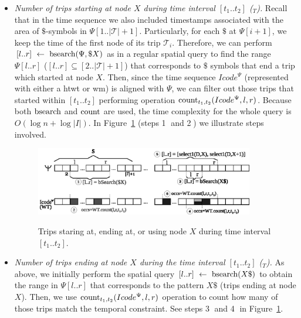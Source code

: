 	\begin{itemize}
	
		\item {\em Number of trips starting at node $X$ during time interval $[t_1..t_2]$ (\startX$_T$).}
		Recall that in the time sequence we also included timestamps associated with the area of $\$$-symbols in $\Psi[1..|\mathcal{T}|+1]$.
		Particularly, for each $\$$ at $\Psi[i+1]$, we keep the time of the first node of its trip $\mathcal{T}_i$. Therefore, 
		we can perform $[l..r]~\leftarrow~\operatorname{bsearch}(\Psi,\$X)$ as in a regular spatial query to find the
		range $\Psi[l..r]$ ($[l..r]\subseteq [2..|\mathcal{T}|+1]$) that corresponds to $\$$ symbols that end a trip which started at node $X$. Then, since the time sequence $Icode^{\Psi}$ 
		(represented with either a \gls{htwt} or \gls{wm}) is
		 aligned with $\Psi$, we can filter out those trips that started within $[t_1..t_2]$ performing operation $\operatorname{count}_{t_1,t_2}(Icode^{\Psi},l,r)$. Because both $\operatorname{bsearch}$ and $\operatorname{count}$ are used, the time complexity for the whole query is $O(\log n + \log|I|)$. In Figure~\ref{fig:ctr:search2} (steps \textcircled{1} and \textcircled{2}) we illustrate steps involved.

	\begin{figure}[th]
		\begin{center}
			{\includegraphics[width=0.90\textwidth]{figures/search2.eps}}
		\end{center}
		\caption{Trips staring at, ending at, or using node $X$  during time interval $[t_1..t_2]$.}
		\label{fig:ctr:search2}
	\end{figure}
		
		\item {\em Number of trips ending at node $X$ during the time interval $[t_1..t_2]$ (\endX$_T$). }
		As above, we initially perform the spatial query $[l..r]~\leftarrow~\operatorname{bsearch}(X\$)$ to 
		obtain the range in $\Psi[l..r]$ that corresponds to the pattern $X\$$ (trips ending at node $X$). Then, we use  $\operatorname{count}_{t_1,t_2}(Icode^{\Psi},l,r)$ operation to count how many of those trips match the temporal constraint. See steps \textcircled{3} and \textcircled{4} in Figure~\ref{fig:ctr:search2}.
		

\end{itemize}
